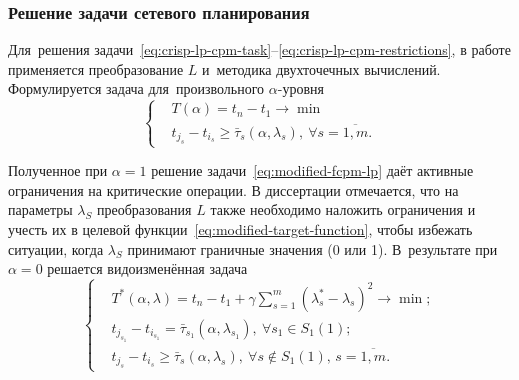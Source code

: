 \documentclass[12pt]{beamer}
\begin{document}
\begin{frame}
  \frametitle{Решение задачи сетевого планирования}
  Для~решения задачи~\eqref{eq:crisp-lp-cpm-task}--\eqref{eq:crisp-lp-cpm-restrictions}, в работе применяется преобразование $L$ и~методика двухточечных вычислений. Формулируется задача для~произвольного $\alpha$-уровня
\begin{equation}
\label{eq:modified-fcpm-lp}
  \left\{ \begin{aligned}
    & T(\alpha )=t_n-t_1\to \min  \\ 
    & t_{j_s}-t_{i_s}\geqslant \bar{\tau}_s\left(\alpha,\lambda_s \right),\ \forall s=\overline{1,m}.
  \end{aligned} \right.
\end{equation}

Полученное при $\alpha=1$ решение задачи~\eqref{eq:modified-fcpm-lp} даёт активные ограничения на критические операции. В диссертации отмечается, что на параметры $\lambda_S$ преобразования $L$ также необходимо наложить ограничения и учесть их в целевой функции~\eqref{eq:modified-target-function}, чтобы избежать ситуации, когда $\lambda_S$ принимают граничные значения (0 или 1). В~результате при $\alpha=0$ решается видоизменённая задача
\begin{equation}
\label{eq:modified-fcpm-lp-alpha}
  \left \{ \begin{aligned}
    & T^* \left(\alpha, \lambda \right) = t_n-t_1+\gamma \sum \limits_{s=1}^{m} \left(\lambda_s^*-\lambda_s \right)^2 \to \min; \\
    & t_{j_{s_1}}-t_{i_{s_1}} = \bar{\tau}_{s_1}\left(\alpha, \lambda_{s_1} \right),\ \forall s_1 \in S_1\left(1\right); \\
    & t_{j_s}-t_{i_s} \geqslant \bar{\tau}_s\left(\alpha, \lambda_s \right),\ \forall s \notin S_1\left(1\right),\,s=\overline{1,m}.
  \end{aligned} \right.
\end{equation}
\end{frame}
\end{document}
